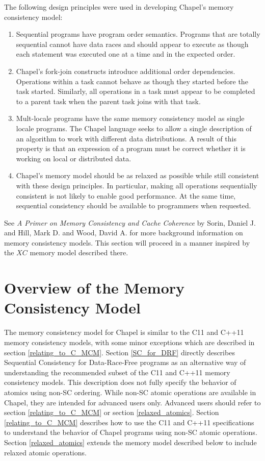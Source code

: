 The following design principles were used in developing Chapel's memory
consistency model:

\begin{enumerate}

  \item Sequential programs have program order semantics.  Programs that
  are totally sequential cannot have data races and should appear to
  execute as though each statement was executed one at a time and in the
  expected order.

  \item Chapel's fork-join constructs introduce additional order
  dependencies.  Operations within a task cannot behave as though they
  started before the task started. Similarly, all operations in a task
  must appear to be completed to a parent task when the parent task joins
  with that task.

  \item Mult-locale programs have the same memory consistency model as
  single locale programs. The Chapel language seeks to allow a single
  description of an algorithm to work with different data distributions.
  A result of this property is that an expression of a program must be
  correct whether it is working on local or distributed data.

  \item Chapel's memory model should be as relaxed as possible while still
  consistent with these design principles. In particular, making all
  operations sequentially consistent is not likely to enable good
  performance. At the same time, sequential consistency should be
  available to programmers when requested.

\end{enumerate}

See \textit{A Primer on Memory Consistency and Cache Coherence} by Sorin,
Daniel J. and Hill, Mark D. and Wood, David A. for more background information
on memory consistency models. This section will proceed in a manner inspired by
the $XC$ memory model described there.

\section{Overview of the Memory Consistency Model}

The memory consistency model for Chapel is similar to the C11 and C++11
memory consistency models, with some minor exceptions which are described
in section \ref{relating_to_C_MCM}. Section \ref{SC_for_DRF} directly
describes Sequential Consistency for Data-Race-Free programs as an
alternative way of understanding the recommended subset of the C11 and
C++11 memory consistency models. This description does not fully specify
the behavior of atomics using non-SC ordering. While non-SC atomic
operations are available in Chapel, they are intended for advanced users
only.  Advanced users should refer to section \ref{relating_to_C_MCM} or
section \ref{relaxed_atomics}. Section \ref{relating_to_C_MCM} describes
how to use the C11 and C++11 specifications to understand the behavior of
Chapel programs using non-SC atomic operations. Section
\ref{relaxed_atomics} extends the memory model described below to include
relaxed atomic operations.

